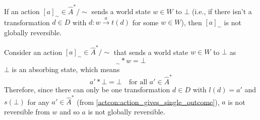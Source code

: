 \begin{propositionE}\label{prp:undefined_action_not_globally_reversible}
    If an action $[a]_{\sim} \in \hat{A}^{*}/\sim$ sends a world state $w \in W$ to $\bot$ (i.e., if there isn't a transformation $d \in D$ with $d: w \xrightarrow{a} t(d)$ for some $w \in W$), then $[a]_{\sim}$ is not globally reversible.
\end{propositionE}
\begin{proofE}
    Consider an action $[a]_{\sim} \in \hat{A}^{*}/\sim$ that sends a world state $w \in W$ to $\bot$ as
    \begin{equation}
        [a]_{\sim} * w = \bot
    \end{equation}
    $\bot$ is an absorbing state, which means
    \begin{equation}
        a' * \bot = \bot \quad \text{for all $a' \in \hat{A}^{*}$}
    \end{equation}
    Therefore, since there can only be one transformation $d \in D$ with $l(d) = a'$ and $s(\bot)$ for any $a' \in \hat{A}^{*}$ (from \cref{actcon:action_gives_single_outcome}), $a$ is not reversible from $w$ and so $a$ is not globally reversible.
\end{proofE}

